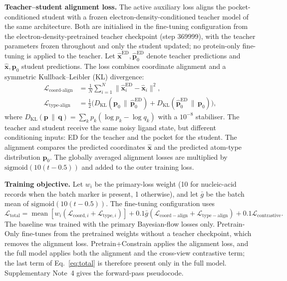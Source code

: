 \documentclass[pdflatex,sn-mathphys-num]{sn-jnl}
\theoremstyle{thmstyleone}
\theoremstyle{thmstyletwo}
\theoremstyle{thmstylethree}
\begin{document}
\medskip
\noindent\textbf{Teacher--student alignment loss.} The active auxiliary loss aligns the pocket-conditioned student with a frozen electron-density-conditioned teacher model of the same architecture. Both are initialised in the fine-tuning configuration from the electron-density-pretrained teacher checkpoint (step 369999), with the teacher parameters frozen throughout and only the student updated; no protein-only fine-tuning is applied to the teacher. Let \(\hat{\mathbf{x}}^{\text{ED}}, \hat{\mathbf{p}}_0^{\text{ED}}\) denote teacher predictions and \(\hat{\mathbf{x}}, \mathbf{p}_0\) student predictions. The loss combines coordinate alignment and a symmetric Kullback--Leibler (KL) divergence:
\begin{align}
\mathcal{L}_{\text{coord-align}} &= \frac{1}{N}\sum_{i=1}^{N} \|\hat{\mathbf{x}}_i^{\text{ED}} - \hat{\mathbf{x}}_i\|^2, \\
\mathcal{L}_{\text{type-align}} &= \frac{1}{2}\bigl(D_{\text{KL}}(\mathbf{p}_0 \,\|\, \hat{\mathbf{p}}_0^{\text{ED}}) + D_{\text{KL}}(\hat{\mathbf{p}}_0^{\text{ED}} \,\|\, \mathbf{p}_0)\bigr),
\end{align}
where \(D_{\text{KL}}(\mathbf{p} \,\|\, \mathbf{q}) = \sum_k p_k (\log p_k - \log q_k)\) with a \(10^{-8}\) stabiliser. The teacher and student receive the same noisy ligand state, but different conditioning inputs: ED for the teacher and the pocket for the student. The alignment compares the predicted coordinates \(\hat{\mathbf{x}}\) and the predicted atom-type distribution \(\mathbf{p}_0\). The globally averaged alignment losses are multiplied by $\mathrm{sigmoid}(10(t-0.5))$ and added to the outer training loss.

\medskip
\noindent\textbf{Training objective.} Let $w_i$ be the primary-loss weight (10 for nucleic-acid records when the batch marker is present, 1 otherwise), and let $\bar g$ be the batch mean of $\mathrm{sigmoid}(10(t-0.5))$. The fine-tuning configuration uses
\begin{equation}
\mathcal{L}_{\mathrm{total}}=\operatorname{mean}\!\left[w_i(\mathcal{L}_{\mathrm{coord},i}+\mathcal{L}_{\mathrm{type},i})\right]+0.1\bar g\left(\mathcal{L}_{\mathrm{coord-align}}+\mathcal{L}_{\mathrm{type-align}}\right)+0.1\mathcal{L}_{\mathrm{contrastive}}.
\label{eq:total}
\end{equation}
The baseline was trained with the primary Bayesian-flow losses only. Pretrain-Only fine-tunes from the pretrained weights without a teacher checkpoint, which removes the alignment loss. Pretrain+Constrain applies the alignment loss, and the full model applies both the alignment and the cross-view contrastive term; the last term of Eq.~\eqref{eq:total} is therefore present only in the full model. Supplementary Note~4 gives the forward-pass pseudocode.
\end{document}
